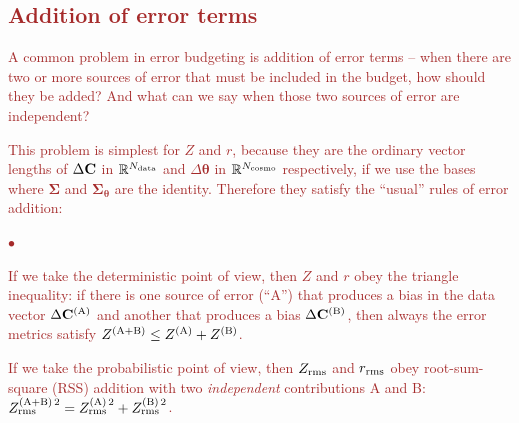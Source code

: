 \documentclass[usenatbib]{mnras}
\newcommand{\changetext}[1]{\textcolor{brown}{#1}}
\begin{document}
\subsection{\changetext{Addition of error terms}}
\label{ss:addition-error}

\changetext{A common problem in error budgeting is addition of error terms -- when there are two or more sources of error that must be included in the budget, how should they be added? And what can we say when those two sources of error are independent?}

\changetext{This problem is simplest for $Z$ and $r$, because they are the ordinary vector lengths of $\Delta{\bf C}$ in ${\mathbb R}^{N_{\rm data}}$ and $\Delta{\boldsymbol\theta}$ in ${\mathbb R}^{N_{\rm cosmo}}$ respectively, if we use the bases where ${\boldsymbol\Sigma}$ and ${\boldsymbol\Sigma}_{\boldsymbol\theta}$ are the identity. Therefore they satisfy the ``usual'' rules of error addition:
\begin{list}{$\bullet$}{}
\item If we take the deterministic point of view, then $Z$ and $r$ obey the triangle inequality: if there is one source of error (``A'') that produces a bias in the data vector $\Delta{\bf C}^{(\rm A)}$ and another that produces a bias $\Delta{\bf C}^{(\rm B)}$, then always the error metrics satisfy $Z^{(\rm A+B)} \le Z^{(\rm A)} + Z^{(\rm B)}$.
\item If we take the probabilistic point of view, then $Z_{\rm rms}$ and $r_{\rm rms}$ obey root-sum-square (RSS) addition with two {\em independent} contributions A and B: $Z^{(\rm A+B)\,2}_{\rm rms} = Z^{(\rm A)\,2}_{\rm rms} + Z^{(\rm B)\,2}_{\rm rms}$.
\end{list}}
\end{document}
